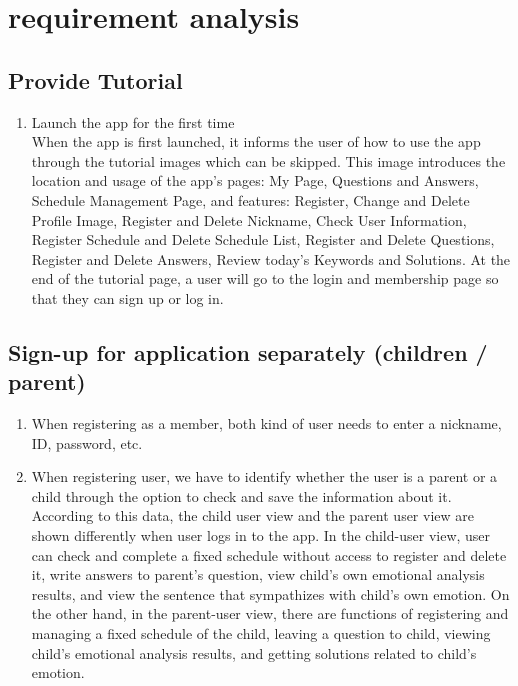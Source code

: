 \documentclass[conference]{IEEEtran}
\begin{document}
\section{requirement analysis}

\subsection{Provide Tutorial}
\begin{enumerate}
  \item Launch the app for the first time \\
    When the app is first launched, it informs the user of how to use the app through the tutorial images which can be skipped. This image introduces the location and usage of the app's pages: My Page, Questions and Answers, Schedule Management Page, and features: Register, Change and Delete Profile Image, Register and Delete Nickname, Check User Information, Register Schedule and Delete Schedule List, Register and Delete Questions, Register and Delete Answers, Review today's Keywords and Solutions. At the end of the tutorial page, a user will go to the login and membership page so that they can sign up or log in.
  
\end{enumerate}

\subsection{Sign-up for application separately (children / parent)}

\begin{enumerate}
  \item When registering as a member, both kind of user needs to enter a nickname, ID, password, etc.
  
  \item When registering user, we have to identify whether the user is a parent or a child through the option to check and save the information about it. According to this data, the child user view and the parent user view are shown differently when user logs in to the app. In the child-user view, user can check and complete a fixed schedule without access to register and delete it, write answers to parent’s question, view child’s own emotional analysis results, and view the sentence that sympathizes with child's own emotion. On the other hand, in the parent-user view, there are functions of registering and managing a fixed schedule of the child, leaving a question to child, viewing child's emotional analysis results, and getting solutions related to child’s emotion.
\end{enumerate}
\end{document}

